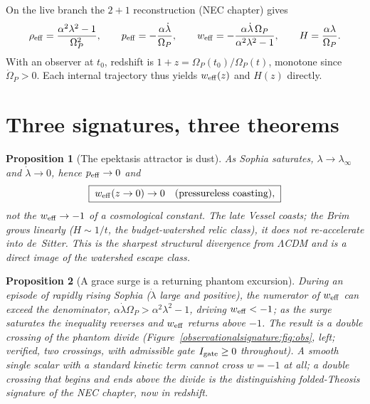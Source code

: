 \documentclass[11pt,a4paper,oneside]{book}
\newcommand{\Op}{\Omega_P}
\newcommand{\weff}{w_{\rm eff}}
\theoremstyle{plain}
\newtheorem{proposition}{Proposition}[chapter]
\theoremstyle{definition}
\theoremstyle{remark}
\begin{document}
On the live branch the $2{+}1$ reconstruction (NEC chapter) gives
\begin{equation}
\rho_{\rm eff}=\frac{\alpha^2\lambda^2-1}{\Op^2},\qquad
p_{\rm eff}=-\frac{\alpha\dot\lambda}{\Op},\qquad
\weff=-\frac{\alpha\dot\lambda\,\Op}{\alpha^2\lambda^2-1},\qquad
H=\frac{\alpha\lambda}{\Op}.
\end{equation}
With an observer at $t_0$, redshift is $1+z=\Op(t_0)/\Op(t)$, monotone since $\dot\Op>0$. Each internal
trajectory thus yields $\weff(z)$ and $H(z)$ directly.

\section{Three signatures, three theorems}

\begin{proposition}[The epektasis attractor is dust]\label{observationalsignature:prop:dust}
As Sophia saturates, $\lambda\to\lambda_\infty$ and $\dot\lambda\to0$, hence $p_{\rm eff}\to0$ and
\begin{equation}
\boxed{\;\weff(z\to0)\to 0\quad(\text{pressureless coasting}),\;}
\end{equation}
not the $\weff\to-1$ of a cosmological constant. The late Vessel coasts; the Brim grows linearly
($H\sim 1/t$, the budget-watershed relic class), it does not re-accelerate into de~Sitter. This is the
sharpest structural divergence from $\Lambda$CDM and is a direct image of the watershed escape class.
\end{proposition}

\begin{proposition}[A grace surge is a returning phantom excursion]\label{observationalsignature:prop:phantom}
During an episode of rapidly rising Sophia ($\dot\lambda$ large and positive), the numerator of $\weff$
can exceed the denominator, $\alpha\dot\lambda\Op>\alpha^2\lambda^2-1$, driving $\weff<-1$; as the surge
saturates the inequality reverses and $\weff$ returns above $-1$. The result is a \emph{double crossing}
of the phantom divide (Figure~\ref{observationalsignature:fig:obs}, left; verified, two crossings, with admissible gate
$I_{\rm gate}\ge0$ throughout). A smooth single scalar with a standard kinetic term cannot cross $w=-1$
at all; a double crossing that begins and ends above the divide is the distinguishing
\emph{folded-Theosis} signature of the NEC chapter, now in redshift.
\end{proposition}
\end{document}
